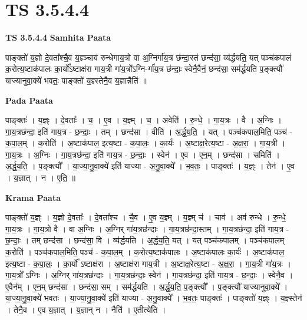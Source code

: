 \documentclass[17pt]{extarticle}
\begin{document}
\section{ TS 3.5.4.4 }

\textbf{TS 3.5.4.4 } \newline
\textbf{Samhita Paata} \newline

पाङ्क्तो॑ य॒ज्ञो दे॒वता᳚श्चै॒व य॒ज्ञ्ञ्चाव॑ रुन्धेगाय॒त्रो वा अ॒ग्निर्गा॑य॒त्र छ॑न्दा॒स्तं छन्द॑सा॒ व्य॑र्द्धयति॒ यत् पञ्च॑कपालं क॒रोत्य॒ष्टाक॑पालः का॒र्यो᳚ऽष्टाक्ष॑रा गाय॒त्री गा॑य॒त्रो᳚ऽग्नि-र्गा॑य॒त्र छ॑न्दाः॒ स्वेनै॒वैनं॒ छन्द॑सा॒ सम॑र्द्धयति प॒ङ्क्त्यौ॑ याज्यानुवा॒क्ये॑ भवतः॒ पाङ्क्तो॑ य॒ज्ञ्स्तेनै॒व य॒ज्ञान्नैति॑ ॥ \newline

\textbf{Pada Paata} \newline

पाङ्क्तः॑ । य॒ज्ञ्ः । दे॒वताः᳚ । च॒ । ए॒व । य॒ज्ञ्म् । च॒ । अवेति॑ । रु॒न्धे॒ । गा॒य॒त्रः । वै । अ॒ग्निः । गा॒य॒त्रछ॑न्दा॒ इति॑ गाय॒त्र - छ॒न्दाः॒ । तम् । छन्द॑सा । वीति॑ । अ॒र्द्ध॒य॒ति॒ । यत् । पञ्च॑कपाल॒मिति॒ पञ्च॑ - क॒पा॒ल॒म् । क॒रोति॑ । अ॒ष्टाक॑पाल॒ इत्य॒ष्टा - क॒पा॒लः॒ । का॒र्यः॑ । अ॒ष्टाक्ष॒रेत्य॒ष्टा - अ॒क्ष॒रा॒ । गा॒य॒त्री । गा॒य॒त्रः । अ॒ग्निः । गा॒य॒त्रछ॑न्दा॒ इति॑ गाय॒त्र - छ॒न्दाः॒ । स्वेन॑ । ए॒व । ए॒न॒म् । छन्द॑सा । समिति॑ । अ॒र्द्ध॒य॒ति॒ । प॒ङ्क्त्यौ᳚ । या॒ज्या॒नु॒वा॒क्ये॑ इति॑ याज्या - अ॒नु॒वा॒क्ये᳚ । भ॒व॒तः॒ । पाङ्क्तः॑ । य॒ज्ञ्ः । तेन॑ । ए॒व । य॒ज्ञात् । न । ए॒ति॒ ॥  \newline


\textbf{Krama Paata} \newline

पाङ्क्तो॑ य॒ज्ञ्ः । य॒ज्ञो दे॒वताः᳚ । दे॒वता᳚श्च । चै॒व । ए॒व य॒ज्ञ्म् । य॒ज्ञ्म् च॑ । चाव॑ । अव॑ रुन्धे । रु॒न्धे॒ गा॒य॒त्रः । गा॒य॒त्रो वै । वा अ॒ग्निः । अ॒ग्निर् गा॑य॒त्रछ॑न्दाः । गा॒य॒त्रछ॑न्दा॒स्तम् । गा॒य॒त्रछ॑न्दा॒ इति॑ गाय॒त्र - छ॒न्दाः॒ । तम् छन्द॑सा । छन्द॑सा॒ वि । व्य॑र्द्धयति । अ॒र्द्ध॒य॒ति॒ यत् । यत् पञ्च॑कपालम् । पञ्च॑कपालम् क॒रोति॑ । पञ्च॑कपाल॒मिति॒ पञ्च॑ - क॒पा॒ल॒म् । क॒रोत्य॒ष्टाक॑पालः । अ॒ष्टाक॑पालः का॒र्यः॑ । अ॒ष्टाक॑पाल॒ इत्य॒ष्टा - क॒पा॒लः॒ । का॒र्यो᳚ ऽष्टाक्ष॑रा । अ॒ष्टाक्ष॑रा गाय॒त्री । अ॒ष्टाक्ष॒रेत्य॒ष्टा - अ॒क्ष॒रा॒ । गा॒य॒त्री गा॑य॒त्रः । गा॒य॒त्रो᳚ ऽग्निः । अ॒ग्निर् गा॑य॒त्रछ॑न्दाः । गा॒य॒त्रछ॑न्दाः॒ स्वेन॑ । गा॒य॒त्रछ॑न्दा॒ इति॑ गाय॒त्र - छ॒न्दाः॒ । स्वेनै॒व । ए॒वैन᳚म् । ए॒न॒म् छन्द॑सा । छन्द॑सा॒ सम् । सम॑र्द्धयति । अ॒र्द्ध॒य॒ति॒ प॒ङ्क्त्यौ᳚ । प॒ङ्क्त्यौ॑ याज्यानुवा॒क्ये᳚ । या॒ज्या॒नु॒वा॒क्ये॑ भवतः । या॒ज्या॒नु॒वा॒क्ये॑ इति॑ याज्या - अ॒नु॒वाक्ये᳚ । भ॒व॒तः॒ पाङ्क्तः॑ । पाङ्क्तो॑ य॒ज्ञ्ः । य॒ज्ञ्स्तेन॑ । तेनै॒व । ए॒व य॒ज्ञात् । य॒ज्ञान् न । नैति॑ । ए॒तीत्ये॑ति । \newline
\end{document}
